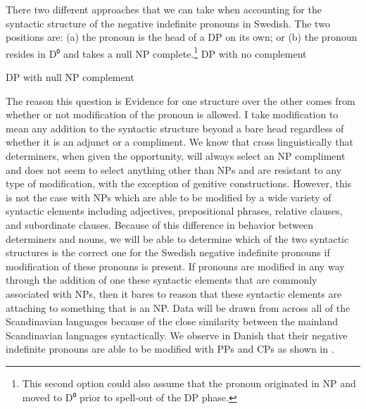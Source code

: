 \documentclass[12pt, letterpaper]{article}
\begin{document}
\ea There two different approaches that we can take when accounting for the syntactic structure of the negative indefinite pronouns in Swedish. The two positions are: (a) the pronoun is the head of a DP on its own; or (b) the pronoun resides in D⁰ and takes a null NP complete.\footnote{This second option could also assume that the pronoun originated in NP and moved to D⁰ prior to spell-out of the DP phase.}
	\ea DP with no complement \label{ex:NNP}\\
	\ex DP with null NP complement \label{ex:DN} \\
	\z
\ex The reason this question is 
\ex Evidence for one structure over the other comes from whether or not modification of the pronoun is allowed. 
	\ea I take modification to mean any addition to the syntactic structure beyond a bare head regardless of whether it is an adjunct or a compliment. 
	\z 
\ex We know that cross linguistically that determiners, when given the opportunity, will always select an NP compliment and does not seem to select anything other than NPs and are resistant to any type of modification, with the exception of genitive constructions. 
\ex However, this is not the case with NPs which are able to be modified by a wide variety of syntactic elements including adjectives, prepositional phrases, relative clauses, and subordinate clauses. 
\ex Because of this difference in behavior between determiners and nouns, we will be able to determine which of the two syntactic structures is the correct one for the Swedish negative indefinite pronouns if modification of these pronouns is present.
\ex If pronouns are modified in any way through the addition of one these syntactic elements that are commonly associated with NPs, then it bares to reason that these syntactic elements are attaching to something that is an NP.
\ex Data will be drawn from across all of the Scandinavian languages because of the close similarity between the mainland Scandinavian languages syntactically.
\ex We observe in Danish that their negative indefinite pronouns are able to be modified with PPs and CPs as shown in \citet[218ff]{allanDanishComprehensiveGrammar1995}.
\end{document}
